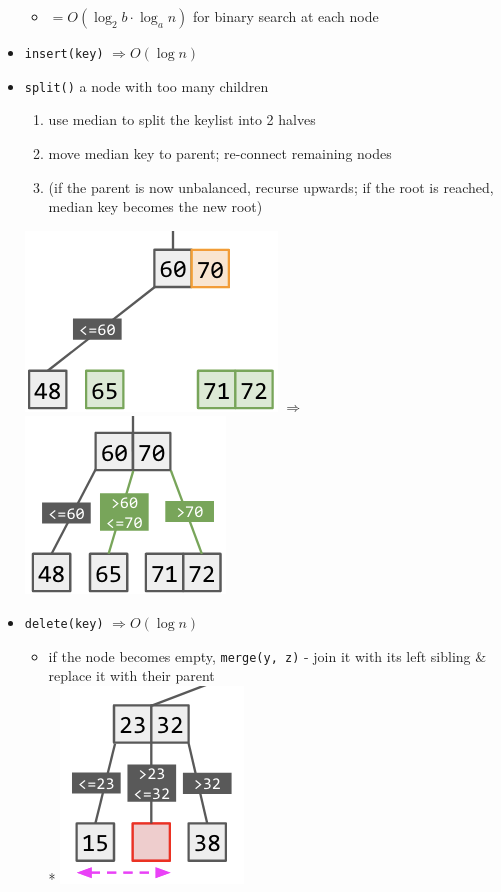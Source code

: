 \documentclass[10pt]{article}
\let\Then\Rightarrow
\newcommand{\code}[1]{\textcolor{mygreen}{\texttt{#1}}}
\begin{document}
\begin{multicols}{3}
\begin{itemize}
    \begin{itemize}
        \item $= O(\log_2 b \cdot \log_a n)$ for binary search at each node
    \end{itemize}
    \item \code{insert(key)} $\Then O(\log n)$
    \item \code{split()} a node with too many children
    \begin{enumerate}
        \item use median to split the keylist into 2 halves
        \item move median key to parent; re-connect remaining nodes
        \item (if the parent is now unbalanced, recurse upwards; if the root is reached, median key becomes the new root)
    \end{enumerate}
    \includegraphics[width=0.35\linewidth]{cs2040s-abtree-split-1.png}
    $\Then$
    \includegraphics[width=0.28\linewidth]{cs2040s-abtree-split-2.png}
    \item \code{delete(key)} $\Then O(\log n)$
    \begin{itemize}
        \item if the node becomes empty, \code{merge(y, z)} - join it with its left sibling \& replace it with their parent
        \\* \includegraphics[width=0.25\linewidth]{cs2040s-abtree-delete-1.png}

\end{itemize}
\end{itemize}
\end{multicols}
\end{document}
